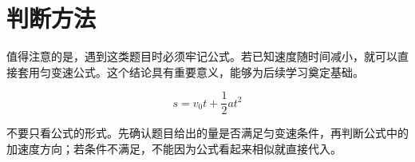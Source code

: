 \section{判断方法}

值得注意的是，遇到这类题目时必须牢记公式。若已知速度随时间减小，就可以直接套用匀变速公式。这个结论具有重要意义，能够为后续学习奠定基础。

\begin{equation}
  s=v_0t+\frac{1}{2}at^2
\end{equation}

不要只看公式的形式。先确认题目给出的量是否满足匀变速条件，再判断公式中的加速度方向；若条件不满足，不能因为公式看起来相似就直接代入。
